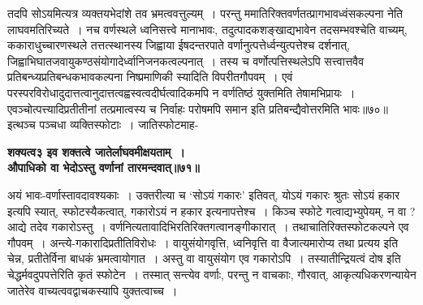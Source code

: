 {{{{ तदपि सोऽयमित्यत्र व्यक्तयभेदांशे तव भ्रमत्ववत्तुल्यम्~।
परन्तु ममातिरिक्तवर्णतत्प्रागभावध्वंसकल्पना नेति लाघवमतिरिच्यते~।
नच वर्णस्थले ध्वनिसत्त्वे मानाभावः, तदुत्पादकशङ्खाद्यभावेन तदसम्भवश्चेति वाच्यम्, ककाराधुच्चारणस्थले तत्तत्स्थानस्य जिह्वाया ईषदन्तरपाते वर्णानुत्पत्तेर्ध्वन्युत्पत्तेश्च दर्शनात्, जिह्वाभिघातजवायुकण्ठसंयोगादेर्ध्वानिजनकत्वल्पनात्~।
तस्य च वर्णोत्पत्तिस्थलेऽपि सत्त्वात्तवैव प्रतिबन्ध्यप्रतिबन्धकभावकल्पना निष्प्रमाणिकी स्यादिति विपरीतगौपवम्~।
एवं परस्परविरोधादुदात्तत्वानुदात्तत्वह्वस्वत्वदीर्घत्वादिकमपि न वर्णतिष्ठं युक्तमिति तेषामभिप्रायः~।
एवञ्चोत्पत्त्यादिप्रतीतीनां तत्प्रमात्वस्य च निर्वाहः परोषमपि समान इति प्रतिबन्द्यैवोत्तरमिति भावः॥७०॥
 इत्थञ्च पञ्चधा व्यक्तिस्फोटाः~।
जातिस्फोटमाह-
\begin{center}{\bfseries शक्यत्व३ इव शक्तत्वे जातेर्लाघवमीक्षयताम्~।\\
औपाधिको वा भेदोऽस्तु वर्णानां तारमन्दवात्॥७१॥}\end{center}
 अयं भावः-वर्णास्तावदावश्यकाः~।
उक्तरीत्या च `सोऽयं गकारः' इतिवत्, योऽयं गकारः श्रुतः सोऽयं हकार इत्यपि स्यात्, स्फोटस्यैकत्वात्, गकारोऽयं न हकार इत्यनापत्तेश्च~।
किञ्च स्फोटे गत्वाद्यभ्युपेयम्, न वा ? आद्ये तदेव गकारोऽस्तु~।
वर्णनित्यतावादिभिरतिरिक्तगत्वानङ्गीकारात्~।
तथाचातिरिक्तस्फोटकल्पने एव गौपवम्~।
अन्त्ये-गकारादिप्रतीतिविरोधः~।
वायुसंयोगवृत्ति, ध्वनिवृत्ति वा वैजात्यमारोप्य तथा प्रत्यय इति चेन्न, प्रतीतेर्विना बाधकं भ्रमत्वायोगात~।
अस्तु वा वायुसंयोग एव गकारोऽपि~।
तस्यातीन्द्रियत्वं दोष इति चेद्धर्मवदुपपत्तेरिति कृतं स्फोटेन~।
तस्मात् सन्त्येव वर्णाः, परन्तु न वाचकाः, गौरवात्, आकृत्यधिकरणन्यायेन जातेरेव वाच्यत्ववद्वाचकस्यापि युक्तत्वाच्च~।
 
}}}}
